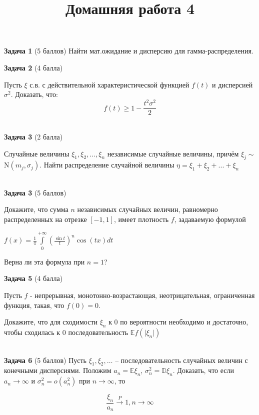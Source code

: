 \documentclass{article}
\title{Домашняя работа 4}
\begin{document}
\maketitle
\textbf{Задача 1} (5 баллов)
Найти мат.ожидание и дисперсию для гамма-распределения.

\textbf{Задача 2} (4 балла)

Пусть $\xi$ с.в. с действительной характеристической функцией $f(t)$ и дисперсией $\sigma^2$. Доказать, что:
$$f(t) \geq 1 - \frac{t^2\sigma^2}{2}$$


\\
\textbf{Задача 3} (2 балла)

Случайные величины $\xi_1, \xi_2, \dots,\xi_n$ независимые случайные величины, причём $\xi_j \sim$
$\mathrm{N}(m_j, \sigma_j)$. Найти распределение случайной величины $\eta = \xi_1 + \xi_2 + ... +\xi_n$

\\
\textbf{Задача 3} (5 баллов)

Докажите, что сумма $n$ независимых случайных величин, равномерно 
распределенных на отрезке $[-1, 1]$, имеет плотность $f$, задаваемую формулой
\begin{center}
    

$f(x) = \frac{1}{\pi}  \int\limits_{0}^{+\infty} \left(\frac{\sin t}{t} \right)^n \cos(tx) dt$

\end{center}
Верна ли эта формула при $n = 1$?

\textbf{Задача 5} (4 балла)

Пусть $f$ - непрерывная, монотонно-возрастающая, неотрицательная, ограниченная функция, такая, что $f(0) = 0$.

Докажите, что для сходимости $\xi_n$ к 0 по вероятности необходимо и достаточно, чтобы сходилась к 0 последовательность $\mathbb E f(\vert \xi_n \vert)$

\\

\textbf{Задача 6} (5 баллов)
Пусть $\xi_1, \xi_2, \dots$ -- последовательность случайных величин с конечными дисперсиями. Положим $a_n = \mathbb E \xi_n$, $\sigma_n^2 = \mathbb D\xi_n$. Доказать, что если $a_n \rightarrow \infty$ и $\sigma_n^2 = o(a_n^2)$ при $n \rightarrow \infty$, то 

$$\frac{\xi_n}{a_n} \overset{P}{\rightarrow} 1, n \rightarrow \infty$$

\\
\end{document}
